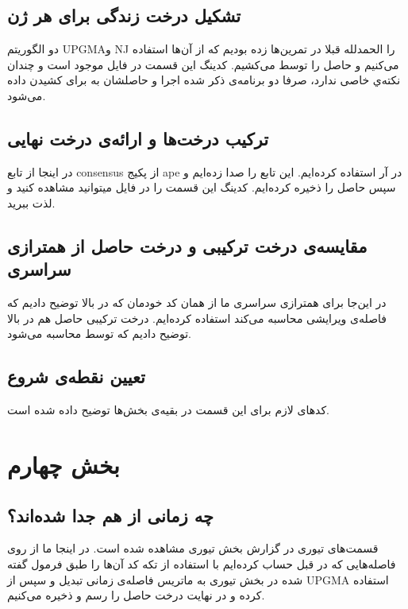 \documentclass[11pt]{article}
\begin{document}
\subsection{تشکیل درخت زندگی برای هر ژن}
دو الگوریتم UPGMAو NJ را الحمدلله قبلا در تمرین‌ها زده بودیم که از آن‌ها استفاده می‌کنیم و حاصل را توسط 
می‌کشیم. کدینگ این قسمت در فایل 
موجود است و چندان نکته‌ي خاصی ندارد، صرفا دو برنامه‌ی ذکر شده اجرا و حاصلشان به 
برای کشیدن داده می‌شود.


 \subsection{ترکیب درخت‌ها و ارائه‌ی درخت نهایی}
در اینجا از تابع 
consensus
از پکیج ape در آر استفاده کرده‌ایم. این تابع را صدا زده‌ایم و سپس حاصل را ذخیره کرده‌ایم. کدینگ این قسمت را در فایل
میتوانید مشاهده کنید و لذت ببرید.
 \subsection{مقایسه‌ی درخت ترکیبی و درخت حاصل از همترازی سراسری}
 در این‌جا برای همترازی سراسری ما از همان کد خودمان که در بالا توضیح دادیم که فاصله‌ی ویرایشی محاسبه می‌کند استفاده کرده‌ایم. درخت ترکیبی حاصل هم در بالا توضیح دادیم که توسط 
 محاسبه می‌شود.
 
\subsection{تعیین نقطه‌ی شروع}
کد‌های لازم برای این قسمت در بقیه‌ی بخش‌ها توضیح داده شده است.
\section{بخش چهارم}
\subsection{چه زمانی از هم جدا شده‌اند؟}
قسمت‌های تیوری در گزارش بخش تیوری مشاهده شده است. در اینجا ما از روی فاصله‌هایی که در قبل حساب کرده‌ایم با استفاده از تکه کد
آن‌ها را طبق فرمول گفته شده در بخش تیوری به ماتریس فاصله‌ی زمانی تبدیل و سپس از UPGMA استفاده کرده و در نهایت درخت حاصل را رسم و ذخیره می‌کنیم.
\end{document}
